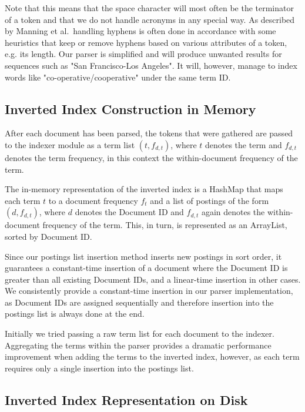 Note that this means that the space character will most often be the terminator of a token and that we do not handle acronyms in any special way. As described by Manning et al.\,\cite[p. 24]{manning2008introduction} handling hyphens is often done in accordance with some heuristics that keep or remove hyphens based on various attributes of a token, e.g. its length. Our parser is simplified and will produce unwanted results for sequences such as "San Francisco-Los Angeles". It will, however, manage to index words like "co-operative/cooperative" under the same term ID.

\subsection*{Inverted Index Construction in Memory}

After each document has been parsed, the tokens that were gathered are passed to the indexer module as a term list $(t, f_{d,t})$, where $t$ denotes the term and $f_{d,t}$ denotes the term frequency, in this context the within-document frequency of the term.

The in-memory representation of the inverted index is a HashMap that maps each term $t$ to a document frequency $f_t$ and a list of postings of the form $(d, f_{d,t})$, where $d$ denotes the Document ID and $f_{d,t}$ again denotes the within-document frequency of the term. This, in turn, is represented as an ArrayList, sorted by Document ID.

Since our postings list insertion method inserts new postings in sort order, it guarantees a constant-time insertion of a document where the Document ID is greater than all existing Document IDs, and a linear-time insertion in other cases. We consistently provide a constant-time insertion in our parser implementation, as Document IDs are assigned sequentially and therefore insertion into the postings list is always done at the end.

Initially we tried passing a raw term list for each document to the indexer. Aggregating the terms within the parser provides a dramatic performance improvement when adding the terms to the inverted index, however, as each term requires only a single insertion into the postings list.

\subsection*{Inverted Index Representation on Disk}


